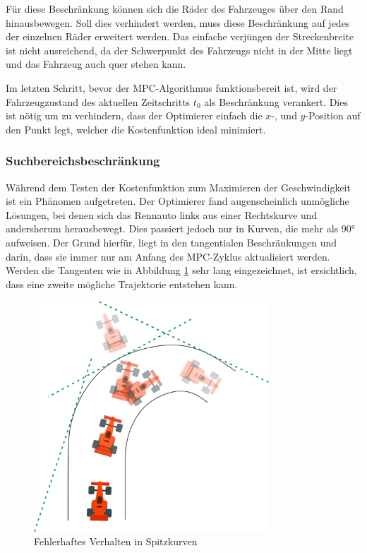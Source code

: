\documentclass{like}
\begin{document}
Für diese Beschränkung können sich die Räder des Fahrzeuges über den Rand hinausbewegen. Soll dies verhindert werden, muss diese Beschränkung auf jedes der einzelnen Räder erweitert werden. Das einfache verjüngen der Streckenbreite ist nicht ausreichend, da der Schwerpunkt des Fahrzeugs nicht in der Mitte liegt und das Fahrzeug auch quer stehen kann.

Im letzten Schritt, bevor der \ac{MPC}-Algorithmus funktionsbereit ist, wird der Fahrzeugzustand des aktuellen Zeitschritts $t_0$ als Beschränkung verankert.  Dies ist nötig um zu verhindern, dass der Optimierer einfach die \(x\)-, und \(y\)-Position auf den Punkt legt, welcher die Kostenfunktion ideal minimiert. 

\subsubsection*{Suchbereichsbeschränkung}
Während dem Testen der Kostenfunktion zum Maximieren der Geschwindigkeit ist ein Phänomen aufgetreten. Der Optimierer fand augenscheinlich unmögliche Lösungen, bei denen sich das Rennauto links aus einer Rechtskurve und andersherum herausbewegt.
Dies passiert jedoch nur in Kurven, die mehr als 90° aufweisen. Der Grund hierfür, liegt in den tangentialen Beschränkungen und darin, dass sie immer nur am Anfang des \ac{MPC}-Zyklus aktualisiert werden. Werden die Tangenten wie in Abbildung \ref{fig:curveAnomaly} sehr lang eingezeichnet, ist ersichtlich, dass eine zweite mögliche Trajektorie entstehen kann. 
\begin{figure}[ht!]
	\centering
	\includegraphics[width=250pt]{Abbildungen/curveAnomaly.png}
	\caption{Fehlerhaftes Verhalten in Spitzkurven}
	\label{fig:curveAnomaly}
\end{figure}
\end{document}

